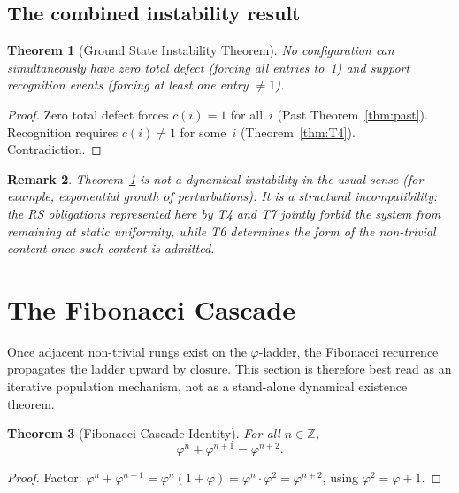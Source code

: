 \documentclass[11pt,a4paper]{article}
\newcommand{\phirs}{\varphi}
\newtheorem{theorem}{Theorem}[section]
\newtheorem{remark}[theorem]{Remark}
\begin{document}
\subsection{The combined instability result}

\begin{theorem}[Ground State Instability Theorem]
\label{thm:main_incompatibility}
No configuration can simultaneously have zero total defect (forcing all entries to~1) and support recognition events (forcing at least one entry $\neq 1$).
\end{theorem}
\begin{proof}
Zero total defect forces $c(i)=1$ for all~$i$ (Past Theorem~\ref{thm:past}).  Recognition requires $c(i)\neq 1$ for some~$i$ (Theorem~\ref{thm:T4}).  Contradiction.
\end{proof}

\begin{remark}
Theorem~\ref{thm:main_incompatibility} is not a dynamical instability in the usual sense (for example, exponential growth of perturbations).  It is a \emph{structural incompatibility}: the RS obligations represented here by T4 and T7 jointly forbid the system from remaining at static uniformity, while T6 determines the form of the non-trivial content once such content is admitted.
\end{remark}

\section{The Fibonacci Cascade}
\label{sec:cascade}

Once adjacent non-trivial rungs exist on the $\phirs$-ladder, the Fibonacci recurrence propagates the ladder upward by closure.  This section is therefore best read as an iterative population mechanism, not as a stand-alone dynamical existence theorem.

\begin{theorem}[Fibonacci Cascade Identity]
\label{thm:fibonacci}
For all $n\in\mathbb Z$,
\begin{equation}
  \phirs^n + \phirs^{n+1} = \phirs^{n+2}.
  \label{eq:fibonacci}
\end{equation}
\end{theorem}
\begin{proof}
Factor: $\phirs^n+\phirs^{n+1}=\phirs^n(1+\phirs)=\phirs^n\cdot\phirs^2=\phirs^{n+2}$, using $\phirs^2=\phirs+1$.
\end{proof}
\end{document}
